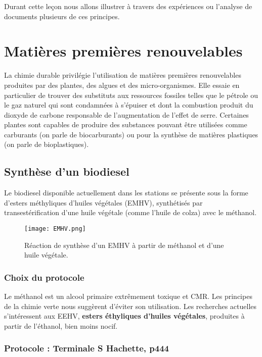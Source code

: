 \documentclass[11pt,a4paper]{report}
\begin{document}
Durant cette leçon nous allons illustrer à travers des expériences ou l'analyse de documents plusieurs de ces principes.

\newpage
\section{Matières premières renouvelables}\label{sec:1}

La chimie durable privilégie l'utilisation de matières premières renouvelables produites par des plantes, des algues et des micro-organismes. Elle essaie en particulier de trouver des substituts aux ressources fossiles telles que le pétrole ou le gaz naturel qui sont condamnées à s'épuiser et dont la combustion produit du dioxyde de carbone responsable de l'augmentation de l'effet de serre. Certaines plantes sont capables de produire des substances pouvant être utilisées comme carburants (on parle de biocarburants) ou pour la synthèse de matières plastiques (on parle de bioplastiques).

\subsection{Synthèse d'un biodiesel}

Le biodiesel disponible actuellement dans les stations se présente sous la forme d'esters méthyliques d'huiles végétales (EMHV), synthétisés par transestérification d'une huile végétale (comme l'huile de colza) avec le méthanol.

\begin{figure}[h!]
	\begin{center}
  		\texttt{[image: EMHV.png]}
	\caption{Réaction de synthèse d'un EMHV à partir de méthanol et d'une huile végétale.}
	\end{center}
\end{figure}

	\subsubsection{Choix du protocole}

Le méthanol est un alcool primaire extrêmement toxique et CMR. Les principes de la chimie verte nous suggèrent d'éviter son utilisation. Les recherches actuelles s'intéressent aux EEHV, \textbf{esters éthyliques d'huiles végétales}, produites à partir de l'éthanol, bien moins nocif.

	\subsubsection{Protocole : Terminale S Hachette, p444}
\end{document}
